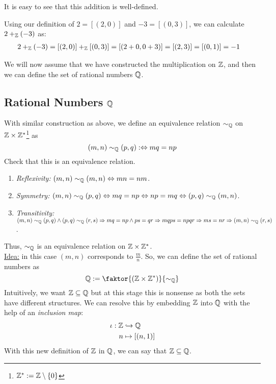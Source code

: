 It is easy to see that this addition is well-defined.
\begin{example}[2 + (-3) = -1]
	Using our definition of \(2 = [(2, 0)]\) and \(-3 = [(0, 3)]\), we can calculate \(2 +_{\mathbb Z} (-3)\) as:
	\begin{align*}
		2 +_{\mathbb Z} (-3) & = [(2, 0)] +_{\mathbb Z} [(0, 3)] = [(2 + 0, 0 + 3)] = [(2, 3)] = [(0, 1)] = -1
	\end{align*}
\end{example}
We will now assume that we have constructed the multiplication on \(\mathbb Z\)\footnotemark, and then we can define the set of rational numbers \(\mathbb Q\).
\subsection[Rational Numbers]{Rational Numbers \(\mathbb Q\)}
With similar construction as above, we define an equivalence relation \(\sim_{\mathbb Q}\) on \(\mathbb Z \times \mathbb Z^\ast\)\footnote{\(\mathbb Z^\ast := \mathbb Z \setminus \qty{0}\)} as
\begin{equation}
	(m, n) \sim_{\mathbb Q} (p, q) :\Leftrightarrow m q = n p
\end{equation}
Check that this is an equivalence relation.
\begin{enumerate}
	\item \emph{Reflexivity:} \((m, n) \sim_{\mathbb Q} (m, n) \Leftrightarrow m n = n m\).
	\item \emph{Symmetry:} \((m, n) \sim_{\mathbb Q} (p, q) \Leftrightarrow m q = n p \Leftrightarrow n p = m q \Leftrightarrow (p, q) \sim_{\mathbb Q} (m, n)\).
	\item \emph{Transitivity:} \((m, n) \sim_{\mathbb Q} (p, q) \land (p, q) \sim_{\mathbb Q} (r, s) \Rightarrow m q = n p \land p s = q r \Rightarrow m q p s = n p q r \Rightarrow m s = n r \Rightarrow (m, n) \sim_{\mathbb Q} (r, s)\).
\end{enumerate}
Thus, \(\sim_{\mathbb Q}\) is an equivalence relation on \(\mathbb Z \times \mathbb Z^\ast\).\\
\uline{Idea:} in this case \((m, n)\) corresponds to \(\frac{m}{n}\). So, we can define the set of rational numbers as
\begin{equation}
	\Q := \faktor{(\Z \times \Z^\ast)}{\sim_{\Q}}
\end{equation}
Intuitively, we want \(\mathbb Z \subseteq \mathbb Q\) but at this stage this is nonsense as both the sets have different structures. We can resolve this by embedding \(\mathbb Z\) into \(\mathbb Q\) with the help of an \emph{inclusion map}:
\begin{equation}
	\begin{aligned}
		\iota: \mathbb Z & \hookrightarrow \mathbb Q         \\
		n         & \mapsto [(n, 1)]
	\end{aligned}
\end{equation}
With this new definition of \(\mathbb Z\) in \(\mathbb Q\), we can say that \(\mathbb Z \subseteq \mathbb Q\).

